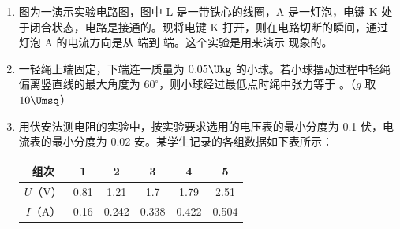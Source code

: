 \documentclass[\gkver]{gaokaozhenti}
\begin{document}
\begin{enumerate}

\item
图为一演示实验电路图，图中 L 是一带铁心的线圈，A 是一灯泡，电键 K 处于闭合状态，电路是接通的。现将电键 K 打开，则在电路切断的瞬间，通过灯泡 A 的电流方向是从  端到  端。这个实验是用来演示  现象的。



\item
一轻绳上端固定，下端连一质量为 $0.05\Ukg$ 的小球。若小球摆动过程中轻绳偏离竖直线的最大角度为 $60^{\circ}$，则小球经过最低点时绳中张力等于 \tkanswer{$1\UN$}。（$g$ 取 $10\Umsq$）

\jdanswer{
$1\UN$
}


\item
用伏安法测电阻的实验中，按实验要求选用的电压表的最小分度为 0.1 伏，电流表的最小分度为 0.02 安。某学生记录的各组数据如下表所示：

\begin{center}
\begin{tabular}{|c|c|c|c|c|c|}
\hline
组次 & 1 & 2 & 3 & 4 & 5 \\
\hline
$U$（V） & 0.81 & 1.21 & 1.7 & 1.79 & 2.51 \\
\hline
$I$（A） & 0.16 & 0.242 & 0.338 & 0.422 & 0.504 \\
\hline
\end{tabular}
\end{center}


\end{enumerate}
\end{document}
